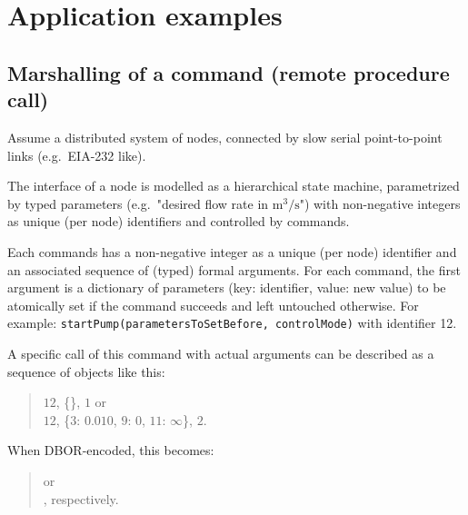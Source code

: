 
\section{Application examples}
\label{sec:applicationexamples}

\subsection{Marshalling of a command (remote procedure call)}

Assume a distributed system of nodes, connected by slow serial point-to-point links (e.g.\ EIA-232 like).

The interface of a node is modelled as a hierarchical state machine, parametrized by typed parameters
(e.g.\ "desired flow rate in $\text{m}^3/\text{s}$") with non-negative integers as unique (per node) identifiers
and controlled by commands.

Each commands has a non-negative integer as a unique (per node) identifier and an associated sequence of
(typed) formal arguments.
For each command, the first argument is a dictionary of parameters (key: identifier, value: new value) to be
atomically set if the command succeeds and left untouched otherwise.
For example: \texttt{startPump(parametersToSetBefore, controlMode)} with identifier 12.

\medskip
\begin{BeginParPenalty}
    A specific call of this command with actual arguments can be described as a sequence of objects like this:
    \begin{quote}
        $12$, \{\}, $1$ or \\
        $12$, \{$3$: $0.010$, $9$: $0$, $11$: $\infty$\}, $2$.
    \end{quote}
\end{BeginParPenalty}

\begin{BeginParPenalty}
    When DBOR-encoded, this becomes:
    \begin{quote}
        or \\
        \ByteSequence{
            \DborFirstByteHex{Number}{0C},
            \DborFirstByteHex{Dictionary}{A7}, %
                \DborFirstByteHex{Number}{03},
                \DborFirstByteHex{Number}{E9}, \DborNextByteHex{01},
                \DborFirstByteHex{Number}{09},
                \DborFirstByteHex{Number}{00},
                \DborFirstByteHex{Number}{0B},
                \DborFirstByteHex{Numberlike}{FE},
            \DborFirstByteHex{Number}{02}
        }, respectively.
    \end{quote}
\end{BeginParPenalty}


